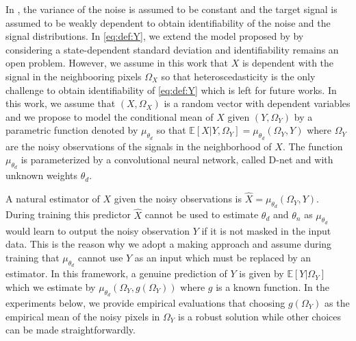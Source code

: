 \documentclass{article}
\begin{document}
In \cite{gassiat:lecorff:lehericy:2021}, the variance of the noise is assumed to be constant and the target signal is assumed to be weakly dependent to obtain identifiability of the noise and the signal  distributions. %
In \eqref{eq:def:Y}, we extend the model  proposed by \cite{gassiat:lecorff:lehericy:2021} by considering a state-dependent standard deviation and identifiability remains an open problem. However, we assume in this work that $X$ is dependent with the signal in the neighbooring pixels $\Omega_X$ so that heteroscedasticity is the only challenge to obtain identifiability of \eqref{eq:def:Y} which is left for future works.
In this work, we assume that $(X,\Omega_X)$ is a random vector with dependent variables and we propose to model the conditional mean of $X$ given $(Y,\Omega_Y)$ by a parametric function denoted by $\mu_{\theta_d}$ so that $\mathbb{E}[X|Y,\Omega_Y] = \mu_{\theta_d}(\Omega_Y,Y)$ where $\Omega_Y$ are the noisy observations of the signals in the neighborhood of $X$. The function $ \mu_{\theta_d}$ is parameterized by a convolutional neural network, called D-net and with unknown weights $\theta_d$.

A natural estimator of $X$ given the noisy observations is $\widehat X = \mu_{\theta_d}(\Omega_Y,Y)$.
During training this predictor $\widehat X$ cannot be used to estimate $\theta_d$ and $\theta_n$ as $\mu_{\theta_d}$ would learn to output the noisy observation $Y$ if it is not masked in the input data.
This is the reason why we adopt a making approach and assume during training that $\mu_{\theta_d}$ cannot use $Y$ as an input which must be replaced by an estimator.
In this framework, a genuine prediction of $Y$ is given by $\mathbb{E}[Y|\Omega_Y]$ which we estimate by $\mu_{\theta_d}(\Omega_Y,g(\Omega_Y))$ where $g$ is a known function. %
In the experiments below, we provide empirical evaluations that choosing $g(\Omega_Y)$ as the empirical mean of the noisy pixels in $\Omega_Y$ is a robust solution while other choices can be made straightforwardly.
\end{document}
